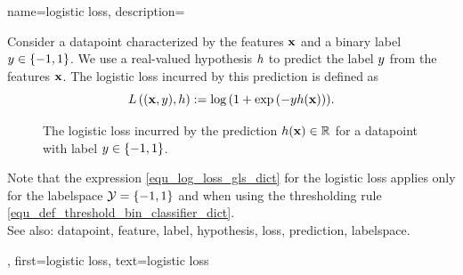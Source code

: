 {name={logistic loss}, 
	description={Consider 
		a \gls{datapoint} characterized by the \glspl{feature} ${\bf x}$ and a binary \gls{label} $y \in \{-1,1\}$. 
		We use a real-valued \gls{hypothesis} $h$ to predict the \gls{label} $y$ 
		from the \glspl{feature} ${\bf x}$. The logistic \gls{loss} incurred by this \gls{prediction} is 
		defined as 
	\begin{equation} 
		\label{equ_log_loss_gls_dict}
		L\left(({\bf x},y),h \right) :=  \log\, ( 1 + \exp\,(- y h({\bf x}))).
	\end{equation}
	\begin{figure}[H]
	\begin{center}
		\caption{The logistic \gls{loss} incurred by the \gls{prediction} $h({\bf x}) \in \mathbb{R}$ 
			for a \gls{datapoint} with \gls{label} $y \in \{-1,1\}$.}
		\label{fig_logloss_dict}
	\end{center}
	\end{figure}
	Note that the expression \eqref{equ_log_loss_gls_dict} 
	for the logistic \gls{loss} applies only for the \gls{labelspace} $\mathcal{Y} = \{ -1,1\}$ and when using 
	the thresholding rule \eqref{equ_def_threshold_bin_classifier_dict}. 
		\\
		See also: \gls{datapoint}, \gls{feature}, \gls{label}, \gls{hypothesis}, \gls{loss}, \gls{prediction}, \gls{labelspace}.},
	first={logistic loss},
	text={logistic loss}
}
	
